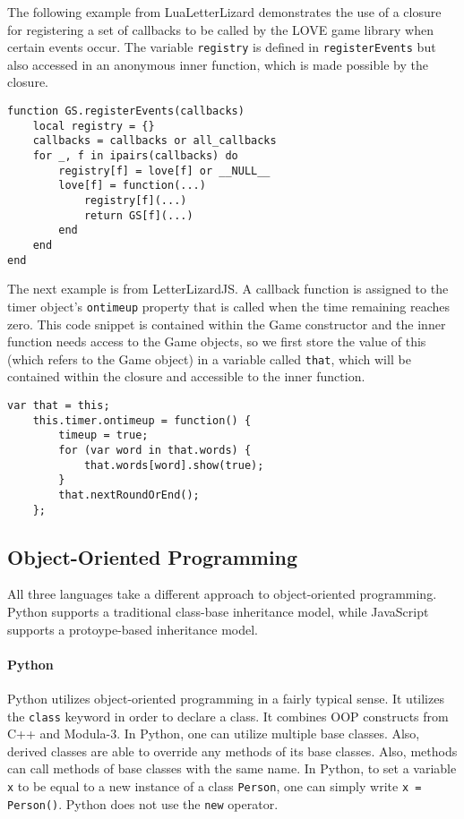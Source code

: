 The following example from LuaLetterLizard demonstrates the use of a closure
for registering a set of callbacks to be called by the LOVE game library when
certain events occur. The variable \texttt{registry} is defined in \texttt{registerEvents}
but also accessed in an anonymous inner function, which is made possible by the closure.

\begin{lstlisting}[language={[5.2]Lua},caption=A closure in Lua]
function GS.registerEvents(callbacks)
	local registry = {}
	callbacks = callbacks or all_callbacks
	for _, f in ipairs(callbacks) do
		registry[f] = love[f] or __NULL__
		love[f] = function(...)
			registry[f](...)
			return GS[f](...)
		end
	end
end
\end{lstlisting}

The next example is from LetterLizardJS. A callback function is assigned to the
timer object's \texttt{ontimeup} property that is called when the time remaining
reaches zero. This code snippet is contained within the Game constructor and the
inner function needs access to the Game objects, so we first store the value of this
(which refers to the Game object) in a variable called \texttt{that}, which will be
contained within the closure and accessible to the inner function.

\begin{lstlisting}[caption=A closure in JavaScript]
	var that = this;
	this.timer.ontimeup = function() {
		timeup = true;
		for (var word in that.words) {
			that.words[word].show(true);
		}
		that.nextRoundOrEnd();
	};
\end{lstlisting}

\subsection{Object-Oriented Programming}
\label{oop}


All three languages take a different approach to object-oriented programming.
Python supports a traditional class-base inheritance model, while JavaScript
supports a protoype-based inheritance model. 

\paragraph{Python}

Python utilizes object-oriented programming in a fairly typical sense. It utilizes the \texttt{class} keyword in order to declare a class. It combines OOP constructs from C++ and Modula-3. In Python, one can utilize multiple base classes. Also, derived classes are able to override any methods of its base classes. Also, methods can call methods of base classes with the same name. In Python, to set a variable \texttt{x} to be equal to a new instance of a class \texttt{Person}, one can simply write \texttt{x = Person()}. Python does not use the \texttt{new} operator. \cite{python_oop}

